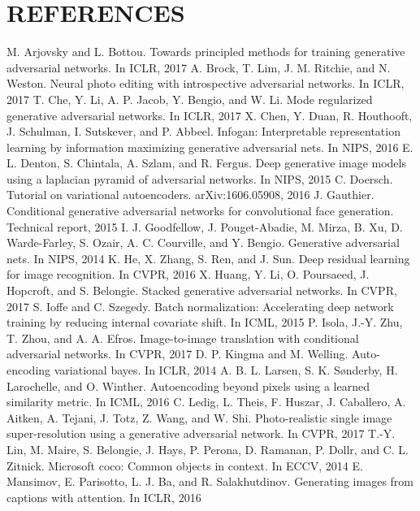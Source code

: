 \documentclass[a4paper,12pt,oneside]{article}
\begin{document}
\newpage
\section{REFERENCES}
\begin{thebibliography}{9}
 M. Arjovsky and L. Bottou. Towards principled methods for
training generative adversarial networks. In ICLR, 2017
 A. Brock, T. Lim, J. M. Ritchie, and N. Weston. Neural photo editing with introspective adversarial networks. In ICLR,
2017
 T. Che, Y. Li, A. P. Jacob, Y. Bengio, and W. Li. Mode
regularized generative adversarial networks. In ICLR, 2017 
 X. Chen, Y. Duan, R. Houthooft, J. Schulman, I. Sutskever,
and P. Abbeel. Infogan: Interpretable representation learning
by information maximizing generative adversarial nets. In
NIPS, 2016
 E. L. Denton, S. Chintala, A. Szlam, and R. Fergus. Deep
generative image models using a laplacian pyramid of adversarial
networks. In NIPS, 2015
 C. Doersch. Tutorial on variational autoencoders.
arXiv:1606.05908, 2016
 J. Gauthier. Conditional generative adversarial networks for convolutional face generation. Technical report, 2015
 I. J. Goodfellow, J. Pouget-Abadie, M. Mirza, B. Xu,
D. Warde-Farley, S. Ozair, A. C. Courville, and Y. Bengio.
Generative adversarial nets. In NIPS, 2014
 K. He, X. Zhang, S. Ren, and J. Sun. Deep residual learning
for image recognition. In CVPR, 2016
 X. Huang, Y. Li, O. Poursaeed, J. Hopcroft, and S. Belongie.
Stacked generative adversarial networks. In CVPR, 2017
 S. Ioffe and C. Szegedy. Batch normalization: Accelerating
deep network training by reducing internal covariate shift. In
ICML, 2015
 P. Isola, J.-Y. Zhu, T. Zhou, and A. A. Efros. Image-to-image translation with conditional adversarial networks. In CVPR,
2017
 D. P. Kingma and M. Welling. Auto-encoding variational
bayes. In ICLR, 2014
 A. B. L. Larsen, S. K. Sønderby, H. Larochelle, and
O. Winther. Autoencoding beyond pixels using a learned
similarity metric. In ICML, 2016
 C. Ledig, L. Theis, F. Huszar, J. Caballero, A. Aitken, A. Tejani, J. Totz, Z. Wang, and W. Shi. Photo-realistic single image
super-resolution using a generative adversarial network.
In CVPR, 2017
 T.-Y. Lin, M. Maire, S. Belongie, J. Hays, P. Perona, D. Ramanan, P. Dollr, and C. L. Zitnick. Microsoft coco: Common
objects in context. In ECCV, 2014
 E. Mansimov, E. Parisotto, L. J. Ba, and R. Salakhutdinov.
Generating images from captions with attention. In ICLR,
2016
\end{thebibliography}
\end{document}
